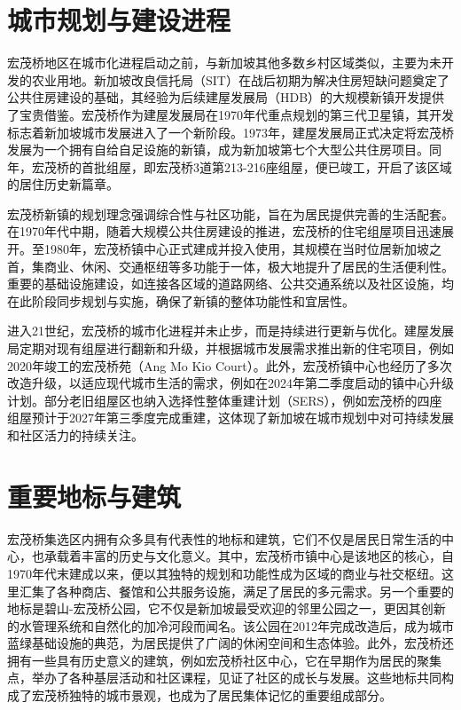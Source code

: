 \documentclass[11pt,a4paper,twoside,openany]{book}
\begin{document}
\section{城市规划与建设进程}
宏茂桥地区在城市化进程启动之前，与新加坡其他多数乡村区域类似，主要为未开发的农业用地。新加坡改良信托局（SIT）在战后初期为解决住房短缺问题奠定了公共住房建设的基础，其经验为后续建屋发展局（HDB）的大规模新镇开发提供了宝贵借鉴。宏茂桥作为建屋发展局在1970年代重点规划的第三代卫星镇，其开发标志着新加坡城市发展进入了一个新阶段。1973年，建屋发展局正式决定将宏茂桥发展为一个拥有自给自足设施的新镇，成为新加坡第七个大型公共住房项目。同年，宏茂桥的首批组屋，即宏茂桥3道第213-216座组屋，便已竣工，开启了该区域的居住历史新篇章。

宏茂桥新镇的规划理念强调综合性与社区功能，旨在为居民提供完善的生活配套。在1970年代中期，随着大规模公共住房建设的推进，宏茂桥的住宅组屋项目迅速展开。至1980年，宏茂桥镇中心正式建成并投入使用，其规模在当时位居新加坡之首，集商业、休闲、交通枢纽等多功能于一体，极大地提升了居民的生活便利性。重要的基础设施建设，如连接各区域的道路网络、公共交通系统以及社区设施，均在此阶段同步规划与实施，确保了新镇的整体功能性和宜居性。

进入21世纪，宏茂桥的城市化进程并未止步，而是持续进行更新与优化。建屋发展局定期对现有组屋进行翻新和升级，并根据城市发展需求推出新的住宅项目，例如2020年竣工的宏茂桥苑（Ang Mo Kio Court）。此外，宏茂桥镇中心也经历了多次改造升级，以适应现代城市生活的需求，例如在2024年第二季度启动的镇中心升级计划。部分老旧组屋区也纳入选择性整体重建计划（SERS），例如宏茂桥的四座组屋预计于2027年第三季度完成重建，这体现了新加坡在城市规划中对可持续发展和社区活力的持续关注。

\section{重要地标与建筑}
宏茂桥集选区内拥有众多具有代表性的地标和建筑，它们不仅是居民日常生活的中心，也承载着丰富的历史与文化意义。其中，宏茂桥市镇中心是该地区的核心，自1970年代末建成以来，便以其独特的规划和功能性成为区域的商业与社交枢纽。这里汇集了各种商店、餐馆和公共服务设施，满足了居民的多元需求。另一个重要的地标是碧山-宏茂桥公园，它不仅是新加坡最受欢迎的邻里公园之一，更因其创新的水管理系统和自然化的加冷河段而闻名。该公园在2012年完成改造后，成为城市蓝绿基础设施的典范，为居民提供了广阔的休闲空间和生态体验。此外，宏茂桥还拥有一些具有历史意义的建筑，例如宏茂桥社区中心，它在早期作为居民的聚集点，举办了各种基层活动和社区课程，见证了社区的成长与发展。这些地标共同构成了宏茂桥独特的城市景观，也成为了居民集体记忆的重要组成部分。
\end{document}
